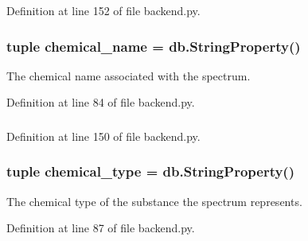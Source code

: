 Definition at line 152 of file backend.py.\hypertarget{classbackend_1_1_spectrum_a1a3576819984b70e068fa2a43a5b11df}{
\subsubsection[{chemical\_\-name}]{\setlength{\rightskip}{0pt plus 5cm}tuple {\bf chemical\_\-name} = db.StringProperty()}}
\label{classbackend_1_1_spectrum_a1a3576819984b70e068fa2a43a5b11df}


The chemical name associated with the spectrum. 

Definition at line 84 of file backend.py.\hypertarget{classbackend_1_1_spectrum_ab23a1bfe0956557e254961031d578c23}{
\subsubsection[{chemical\_\-type}]{}}
\label{classbackend_1_1_spectrum_ab23a1bfe0956557e254961031d578c23}


Definition at line 150 of file backend.py.\hypertarget{classbackend_1_1_spectrum_a97fd097feb78cab8b04a2ffd17a971d4}{
\subsubsection[{chemical\_\-type}]{\setlength{\rightskip}{0pt plus 5cm}tuple {\bf chemical\_\-type} = db.StringProperty()}}
\label{classbackend_1_1_spectrum_a97fd097feb78cab8b04a2ffd17a971d4}


The chemical type of the substance the spectrum represents. 

Definition at line 87 of file backend.py.\hypertarget{classbackend_1_1_spectrum_aa6082c83a20a90e5a2ab9f216961972f}{
\subsubsection[{contents}]{}}
\label{classbackend_1_1_spectrum_aa6082c83a20a90e5a2ab9f216961972f}


